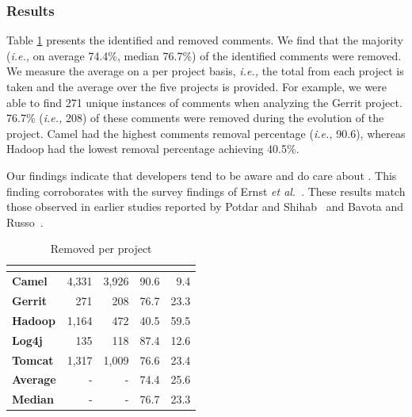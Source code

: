 

\subsubsection*{Results} Table \ref{tbl:removed_self_admitted_technical_debt_per_project} presents the identified and removed \SATD comments. We find that the majority (\textit{i.e.,} on average 74.4\%, median 76.7\%) of the identified \SATD comments were removed. We measure the average on a per project basis, \textit{i.e.,} the total from each project is taken and the average over the five projects is provided. For example, we were able to find 271 unique instances of \SATD comments when analyzing the Gerrit project. 76.7\% (\textit{i.e.,} 208) of these \SATD comments were removed during the evolution of the project. Camel had the highest \SATD comments removal percentage (\textit{i.e.,} 90.6), whereas Hadoop had the lowest removal percentage achieving 40.5\%. 

Our findings indicate that developers tend to be aware and do care about \SATD. This finding corroborates with the survey findings of Ernst \emph{et al.}~\cite{Ernst2015FSE}. These results match those observed in earlier studies reported by Potdar and Shihab~\cite{Potdar2014ICSME} and Bavota and Russo~\cite{Bavota2016MSR}.

\begin{table}[!t]
	\begin{center}
		\caption{Removed \SATD per project}
		\label{tbl:removed_self_admitted_technical_debt_per_project}
		\begin{tabular}{l|rrrr}
			\toprule
			\textbf{\thead{Project}} & \textbf{\thead{\#identified}} & \textbf{\thead{\#removed}} & \textbf{\thead{\% removed}} &  \textbf{\thead{\% remains}}  \\ 
			\midrule
			\textbf{Camel }  &  4,331  & 3,926  & 90.6  & 9.4\\
			\textbf{Gerrit}  &  271    & 208    & 76.7 & 23.3 \\
			\textbf{Hadoop}  &  1,164  & 472    & 40.5 & 59.5 \\  
			\textbf{Log4j }  &  135    & 118    & 87.4 & 12.6\\ 
			\textbf{Tomcat}  &  1,317  & 1,009  & 76.6 & 23.4\\   
			\midrule
			\textbf{Average} & -       & -      & 74.4 & 25.6\\
			\textbf{Median} & -       & -      & 76.7 & 23.3\\
			\bottomrule
		\end{tabular}
	\end{center}    
\end{table}

